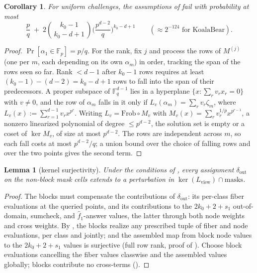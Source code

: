 \documentclass{article}
\newcommand{\Fp}{\mathbb{F}_p}
\newcommand{\Fq}{\mathbb{F}_q}
\newcommand{\extdeg}{d}
\newtheorem{lemma}{Lemma}
\newtheorem{corollary}{Corollary}
\theoremstyle{definition}
\begin{document}
\begin{corollary}\label{cor:twistprob}
For uniform challenges, the assumptions of  fail with probability at most
\[
\frac{p}{q} \;+\; 2 \binom{k_0 - 1}{\,k_0 - \extdeg + 1\,} \Big( \frac{p^{\extdeg - 2}}{q} \Big)^{k_0 - \extdeg + 1}
\qquad (\approx 2^{-124} \text{ for KoalaBear}) .
\]
\end{corollary}

\begin{proof}
$\Pr[\alpha_1 \in \Fp] = p/q$. For the rank, fix $j$ and process the rows of $M^{(j)}$ (one per $m$, each depending on its own $\alpha_m$) in order, tracking the span of the rows seen so far. Rank $< \extdeg - 1$ after $k_0 - 1$ rows requires at least $(k_0 - 1) - (\extdeg - 2) = k_0 - \extdeg + 1$ rows to fall into the span of their predecessors. A proper subspace of $\Fq^{\extdeg - 1}$ lies in a hyperplane $\{x : \sum_r v_r x_r = 0\}$ with $v \neq 0$, and the row of $\alpha_m$ falls in it only if $L_v(\alpha_m) = \sum_r v_r \zeta_m$, where $L_v(x) := \sum_{r=1}^{\extdeg-1} v_r x^{p^r}$. Writing $L_v = \mathrm{Frob} \circ M_v$ with $M_v(x) = \sum_r v_r^{1/p} x^{p^{r-1}}$, a nonzero linearized polynomial of degree $\leq p^{\extdeg - 2}$, the solution set is empty or a coset of $\ker M_v$, of size at most $p^{\extdeg - 2}$. The rows are independent across $m$, so each fall costs at most $p^{\extdeg-2}/q$; a union bound over the choice of falling rows and over the two points gives the second term.
\end{proof}

\begin{lemma}[kernel surjectivity]\label{lem:kersurj}
Under the conditions of , every assignment $\delta_{\mathrm{out}}$ on the non-block mask cells extends to a perturbation in $\ker(L_{\mathrm{view}}) \cap \mathrm{masks}$.
\end{lemma}

\begin{proof}
The blocks must compensate the contributions of $\delta_{\mathrm{out}}$: its per-class fiber evaluations at the queried points, and its contributions to the $2k_0 + 2 + s_1$ out-of-domain, sumcheck, and $\hat{f}_1$-answer values, the latter through both node weights and cross weights. By , the blocks realize any prescribed tuple of fiber and node evaluations, per class and jointly; and the assembled map from block node values to the $2k_0 + 2 + s_1$ values is surjective (full row rank, proof of ). Choose block evaluations cancelling the fiber values classwise and the assembled values globally; blocks contribute no cross-terms ().
\end{proof}
\end{document}
